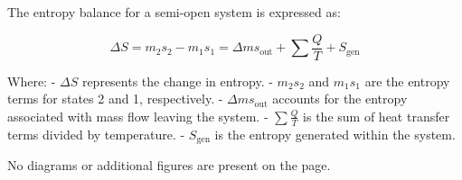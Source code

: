 The entropy balance for a semi-open system is expressed as:  

\[
\Delta S = m_2 s_2 - m_1 s_1 = \Delta m s_{\text{out}} + \sum \frac{Q}{T} + S_{\text{gen}}
\]  

Where:  
- \( \Delta S \) represents the change in entropy.  
- \( m_2 s_2 \) and \( m_1 s_1 \) are the entropy terms for states 2 and 1, respectively.  
- \( \Delta m s_{\text{out}} \) accounts for the entropy associated with mass flow leaving the system.  
- \( \sum \frac{Q}{T} \) is the sum of heat transfer terms divided by temperature.  
- \( S_{\text{gen}} \) is the entropy generated within the system.  

No diagrams or additional figures are present on the page.